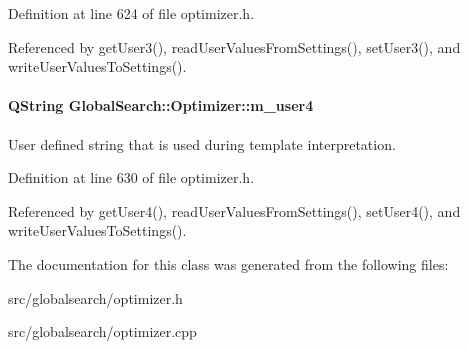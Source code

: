 Definition at line 624 of file optimizer.\+h.



Referenced by get\+User3(), read\+User\+Values\+From\+Settings(), set\+User3(), and write\+User\+Values\+To\+Settings().

\hypertarget{classGlobalSearch_1_1Optimizer_aefab51b84978d2fb49eaf3585894808a}{}
\paragraph[{m\+\_\+user4}]{\setlength{\rightskip}{0pt plus 5cm}Q\+String Global\+Search\+::\+Optimizer\+::m\+\_\+user4\hspace{0.3cm}{\ttfamily [protected]}}\label{classGlobalSearch_1_1Optimizer_aefab51b84978d2fb49eaf3585894808a}
User defined string that is used during template interpretation. 

Definition at line 630 of file optimizer.\+h.



Referenced by get\+User4(), read\+User\+Values\+From\+Settings(), set\+User4(), and write\+User\+Values\+To\+Settings().



The documentation for this class was generated from the following files\+:\begin{DoxyCompactItemize}
\item 
src/globalsearch/optimizer.\+h\item 
src/globalsearch/optimizer.\+cpp\end{DoxyCompactItemize}
